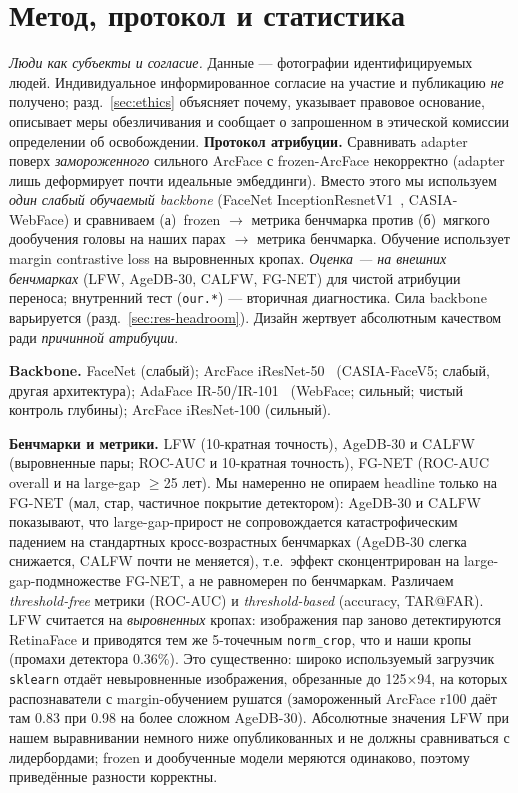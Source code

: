 \documentclass[journal]{IEEEtran}
\begin{document}
\section{Метод, протокол и статистика}\label{sec:method}
\emph{Люди как субъекты и согласие.} Данные — фотографии идентифицируемых людей. Индивидуальное информированное согласие на участие и публикацию \emph{не} получено; разд.~\ref{sec:ethics} объясняет почему, указывает правовое основание, описывает меры обезличивания и сообщает о запрошенном в этической комиссии определении об освобождении.
\textbf{Протокол атрибуции.} Сравнивать adapter поверх \emph{замороженного} сильного ArcFace с frozen-ArcFace некорректно (adapter лишь деформирует почти идеальные эмбеддинги). Вместо этого мы используем \emph{один слабый обучаемый backbone} (FaceNet InceptionResnetV1~\cite{schroff2015facenet}, CASIA-WebFace) и сравниваем (а)~frozen $\rightarrow$ метрика бенчмарка против (б)~мягкого дообучения головы на наших парах $\rightarrow$ метрика бенчмарка. Обучение использует margin contrastive loss на выровненных кропах. \emph{Оценка --- на внешних бенчмарках} (LFW, AgeDB-30, CALFW, FG-NET) для чистой атрибуции переноса; внутренний тест (\texttt{our.*}) --- вторичная диагностика. Сила backbone варьируется (разд.~\ref{sec:res-headroom}). Дизайн жертвует абсолютным качеством ради \emph{причинной атрибуции}.

\textbf{Backbone.} FaceNet (слабый); ArcFace iResNet-50~\cite{deng2019arcface} (CASIA-FaceV5; слабый, другая архитектура); AdaFace IR-50/IR-101~\cite{kim2022adaface} (WebFace; сильный; чистый контроль глубины); ArcFace iResNet-100 (сильный).

\textbf{Бенчмарки и метрики.} LFW (10-кратная точность), AgeDB-30 и CALFW (выровненные пары; ROC-AUC и 10-кратная точность), FG-NET (ROC-AUC overall и на large-gap $\geq$25 лет). Мы намеренно не опираем headline только на FG-NET (мал, стар, частичное покрытие детектором): AgeDB-30 и CALFW показывают, что large-gap-прирост не сопровождается катастрофическим падением на стандартных кросс-возрастных бенчмарках (AgeDB-30 слегка снижается, CALFW почти не меняется), т.е.\ эффект сконцентрирован на large-gap-подмножестве FG-NET, а не равномерен по бенчмаркам. Различаем \emph{threshold-free} метрики (ROC-AUC) и \emph{threshold-based} (accuracy, TAR@FAR). LFW считается на \emph{выровненных} кропах: изображения пар заново детектируются RetinaFace и приводятся тем же 5-точечным \texttt{norm\_crop}, что и наши кропы (промахи детектора 0.36\%). Это существенно: широко используемый загрузчик \texttt{sklearn} отдаёт невыровненные изображения, обрезанные до 125$\times$94, на которых распознаватели с margin-обучением рушатся (замороженный ArcFace r100 даёт там 0.83 при 0.98 на более сложном AgeDB-30). Абсолютные значения LFW при нашем выравнивании немного ниже опубликованных и не должны сравниваться с лидербордами; frozen и дообученные модели меряются одинаково, поэтому приведённые разности корректны.
\end{document}
